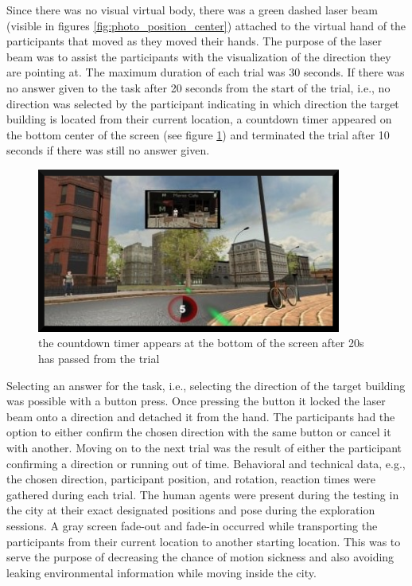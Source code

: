 Since there was no visual virtual body, there was a green dashed laser beam (visible in figures \ref{fig:photo_position_center}) attached to the virtual hand of the participants that moved as they moved their hands. The purpose of the laser beam was to assist the participants with the visualization of the direction they are pointing at. The maximum duration of each trial was 30 seconds. If there was no answer given to the task after 20 seconds from the start of the trial, i.e., no direction was selected by the participant indicating in which direction the target building is located from their current location, a countdown timer appeared on the bottom center of the screen (see figure \ref{fig:timer}) and terminated the trial after 10 seconds if there was still no answer given. 


\begin{figure}[!htb]
	\centering
	\includegraphics[width=100mm]{figures/timer.jpg}
	\caption[The countdown timer]{the countdown timer appears at the bottom of the screen after 20s has passed from the trial}
	\label{fig:timer}
\end{figure}

Selecting an answer for the task, i.e., selecting the direction of the target building was possible with a button press. Once pressing the button it locked the laser beam onto a direction and detached it from the hand. The participants had the option to either confirm the chosen direction with the same button or cancel it with another. Moving on to the next trial was the result of either the participant confirming a direction or running out of time. Behavioral and technical data, e.g., the chosen direction, participant position, and rotation, reaction times were gathered during each trial. The human agents were present during the testing in the city at their exact designated positions and pose during the exploration sessions. A gray screen fade-out and fade-in occurred while transporting the participants from their current location to another starting location. This was to serve the purpose of decreasing the chance of motion sickness and also avoiding leaking environmental information while moving inside the city.


